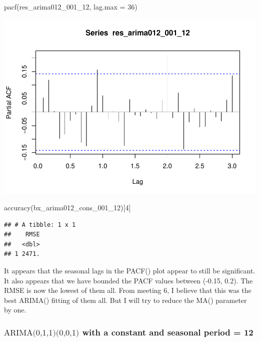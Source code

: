 \documentclass[
]{article}
\newenvironment{Shaded}{\begin{snugshade}}{\end{snugshade}}
\newcommand{\AttributeTok}[1]{\textcolor[rgb]{0.77,0.63,0.00}{#1}}
\newcommand{\DecValTok}[1]{\textcolor[rgb]{0.00,0.00,0.81}{#1}}
\newcommand{\FunctionTok}[1]{\textcolor[rgb]{0.00,0.00,0.00}{#1}}
\newcommand{\NormalTok}[1]{#1}
\begin{document}
\begin{Shaded}
\begin{Highlighting}[]
\FunctionTok{pacf}\NormalTok{(res\_arima012\_001\_12, }\AttributeTok{lag.max =} \DecValTok{36}\NormalTok{)}
\end{Highlighting}
\end{Shaded}

\includegraphics{eighth_meeting_notes_files/figure-latex/arima012 seasonal-2.pdf}

\begin{Shaded}
\begin{Highlighting}[]
\FunctionTok{accuracy}\NormalTok{(bx\_arima012\_cons\_001\_12)[}\DecValTok{4}\NormalTok{]}
\end{Highlighting}
\end{Shaded}

\begin{verbatim}
## # A tibble: 1 x 1
##    RMSE
##   <dbl>
## 1 2471.
\end{verbatim}

It appears that the seasonal lags in the PACF() plot appear to still be
significant. It also appears that we have bounded the PACF values
between (-0.15, 0.2). The RMSE is now the lowest of them all. From
meeting 6, I believe that this was the best ARIMA() fitting of them all.
But I will try to reduce the MA() parameter by one.

\hypertarget{textarima011001-with-a-constant-and-seasonal-period-12}{%
\subsubsection{\texorpdfstring{\(\text{ARIMA(0,1,1)(0,0,1)}\) with a
constant and seasonal period =
12}{\textbackslash text\{ARIMA(0,1,1)(0,0,1)\} with a constant and seasonal period = 12}}\label{textarima011001-with-a-constant-and-seasonal-period-12}}
\end{document}
